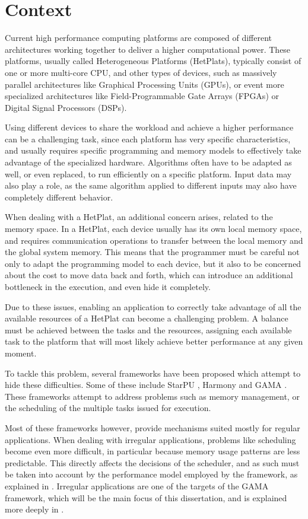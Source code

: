 \section{Context}

Current high performance computing platforms are composed of different architectures working together to deliver a higher computational power. These platforms, usually called Heterogeneous Platforms (HetPlats), typically consist of one or more multi-core CPU, and other types of devices, such as massively parallel architectures like Graphical Processing Units (GPUs), or event more specialized architectures like Field-Programmable Gate Arrays (FPGAs) or Digital Signal Processors (DSPs).

Using different devices to share the workload and achieve a higher performance can be a challenging task, since each platform has very specific characteristics, and usually requires specific programming and memory models to effectively take advantage of the specialized hardware. Algorithms often have to be adapted as well, or even replaced, to run efficiently on a specific platform. Input data may also play a role, as the same algorithm applied to different inputs may also have completely different behavior.

When dealing with a HetPlat, an additional concern arises, related to the memory space. In a HetPlat, each device usually has its own local memory space, and requires communication operations to transfer between the local memory and the global system memory. This means that the programmer must be careful not only to adapt the programming model to each device, but it also to be concerned about the cost to move data back and forth, which can introduce an additional bottleneck in the execution, and even hide it completely.

Due to these issues, enabling an application to correctly take advantage of all the available resources of a HetPlat can become a challenging problem. A balance must be achieved between the tasks and the resources, assigning each available task to the platform that will most likely achieve better performance at any given moment.

To tackle this problem, several frameworks have been proposed which  attempt to hide these difficulties. Some of these include StarPU \cite{augonnet2011starpu}, Harmony \cite{diamos2008harmony} and GAMA \cite{joao2012gama}. These frameworks attempt to address problems such as memory management, or the scheduling of the multiple tasks issued for execution.

Most of these frameworks however, provide mechanisms suited mostly for regular applications. When dealing with irregular applications, problems like scheduling become even more difficult, in particular because memory usage patterns are less predictable. This directly affects the decisions of the scheduler, and as such must be taken into account by the performance model employed by the framework, as explained in \cite{artur2012gama}. Irregular applications are one of the targets of the GAMA framework, which will be the main focus of this dissertation, and is explained more deeply in .



